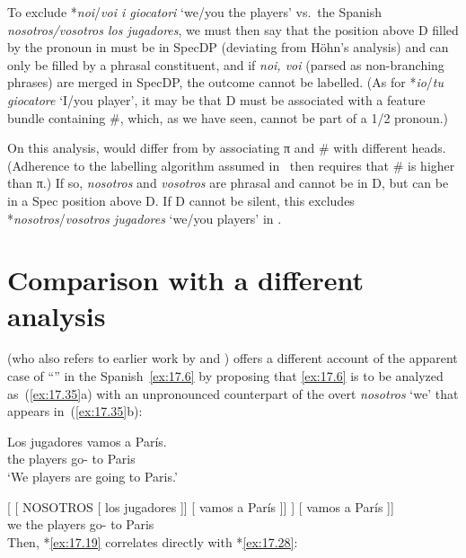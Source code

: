 \documentclass[output=paper]{langsci/langscibook}
\begin{document}
To exclude *\emph{noi}/\emph{voi i giocatori} ‘we/you the players’ vs.\ the
Spanish \emph{nosotros/vos\-otros los jugadores}, we must then say that
the position above D filled by the pronoun in  must be in SpecDP
(deviating from Höhn’s analysis) and can only be filled by a phrasal
constituent, and if \emph{noi, voi} (parsed as non-branching phrases) are
merged in SpecDP, the outcome cannot be labelled. (As for *\emph{io}/\emph{tu
giocatore} ‘I/you player’, it may be that D must be associated with a feature
bundle containing \#, which, as we have seen, cannot be part of a 1/2 \Sg{}
pronoun.)

On this analysis,  would differ from  by associating
π and \# with different heads. (Adherence to the labelling
algorithm assumed in~ then requires that \# is higher than
π.) If so, \emph{nosotros} and \emph{vosotros} are phrasal and cannot be in D,
but can be in a Spec position above D. If D cannot be silent, this excludes
*\emph{nosotros}/\emph{vosotros jugadores} ‘we/you players’ in .

\section{Comparison with a different analysis}\label{sec:17.7}

\textcite{Hoehn2016} (who also refers to earlier work by \citealt{Hurtado1985}
and \citealt{AckemaNeeleman2013}) offers a different account of the apparent
case of “” in the Spanish~\eqref{ex:17.6} by proposing
that \eqref{ex:17.6} is to be analyzed as~(\ref{ex:17.35}a) with an
unpronounced counterpart of the overt \emph{nosotros} ‘we’ that appears
in~(\ref{ex:17.35}b):

\begin{exe}
\exi{\eqref{ex:17.6}}
    \gll    Los jugadores vamos a París.\\
            the players      go-\Fpl{} to Paris\\
    \glt    ‘We players are going to Paris.’
\end{exe}

\ea\label{ex:17.35}
    \ea {}[ [ NOSOTROS [ los jugadores ]] [ vamos a París ]]
    \ex
    \gll    [\tss{IP} [\tss{PersP} nosotros [\tss{DP} los jugadores ]] [ vamos a París ]]\\
            {} {} we {} the players {} go-\Fpl{} to Paris\\
    \z
\z
Then, *\eqref{ex:17.19} correlates directly with *\eqref{ex:17.28}:
\end{document}
